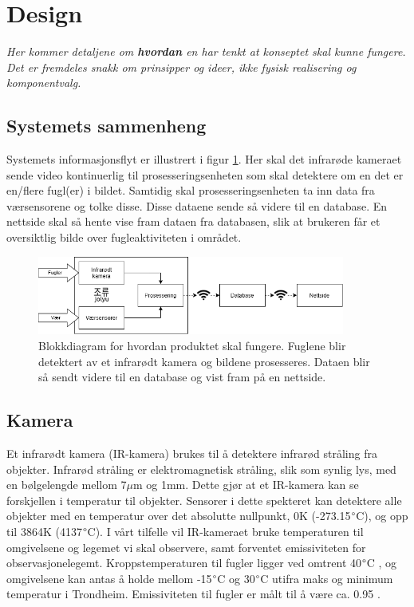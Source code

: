 \section{Design}
\label{sec:design}
\textit{Her kommer detaljene om \textbf{hvordan} en har tenkt at konseptet skal kunne fungere. Det er fremdeles snakk om prinsipper og ideer, ikke fysisk realisering og komponentvalg.}

\subsection{Systemets sammenheng}

Systemets informasjonsflyt er illustrert i figur \ref{fig:blokkDig}. Her skal det infrarøde kameraet sende video kontinuerlig til prosesseringsenheten som skal detektere om en det er en/flere fugl(er) i bildet. Samtidig skal prosesseringsenheten ta inn data fra værsensorene og tolke disse. Disse dataene sende så videre til en database. En nettside skal så hente vise fram dataen fra databasen, slik at brukeren får et oversiktlig bilde over fugleaktiviteten i området. 

\begin{figure}[H]
    \centering
    \includegraphics[width=0.9\textwidth]{konsept/diagram_konsept_v4.png}
    \caption{Blokkdiagram for hvordan produktet skal fungere. Fuglene blir detektert av et infrarødt kamera og bildene prosesseres. Dataen blir så sendt videre til en database og vist fram på en nettside.}
    \label{fig:blokkDig}
\end{figure}


\subsection{Kamera}

Et infrarødt kamera (IR-kamera) brukes til å detektere infrarød stråling fra objekter. Infrarød stråling er elektromagnetisk stråling, slik som synlig lys, med en bølgelengde mellom 7$\mu$m og 1mm\cite{SNL-IR}. Dette gjør at et IR-kamera kan se forskjellen i temperatur til objekter.
Sensorer i dette spekteret kan detektere alle objekter med en temperatur over det absolutte nullpunkt, 0K (-273.15$\degree$C), og opp til 3864K (4137$\degree$C). I vårt tilfelle vil IR-kameraet bruke temperaturen til omgivelsene og legemet vi skal observere, samt forventet emissiviteten for observasjonelegemt. Kroppstemperaturen til fugler ligger ved omtrent 40$\degree$C \cite{fugltemp}, og omgivelsene kan antas å holde mellom -15$\degree$C og 30$\degree$C utifra maks og minimum temperatur i Trondheim. Emissiviteten til fugler er målt til å være ca. 0.95 \cite{fuglemm}.


